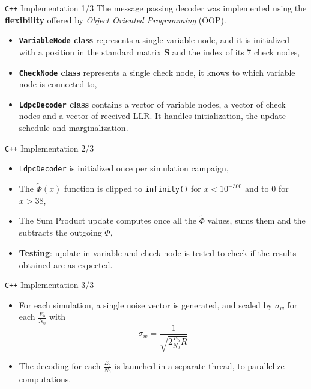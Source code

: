 \documentclass[pdf]
          {beamer}
\begin{document}
\begin{frame}{\texttt{C++} Implementation 1/3}
	The message passing decoder was implemented using the \textbf{flexibility} offered by \textit{Object Oriented Programming} (OOP). 
	\begin{itemize}
		\item \textbf{\texttt{VariableNode} class} represents a single variable node, and it is initialized with a position in the standard matrix $\mathbf{S}$ and the index of its 7 check nodes,
		\item \textbf{\texttt{CheckNode} class} represents a single check node, it knows to which variable node is connected to,
		\item \textbf{\texttt{LdpcDecoder} class} contains a vector of variable nodes, a vector of check nodes and a vector of received LLR. It handles initialization, the update schedule and marginalization.
	\end{itemize}
\end{frame}

\begin{frame}{\texttt{C++} Implementation 2/3} 
	\begin{itemize}
		\item \texttt{LdpcDecoder} is initialized once per simulation campaign,
		\item The $\tilde{\Phi}(x)$ function is clipped to \texttt{infinity()} for $x < 10^{-300}$ and to 0 for $x > 38$,
		\item The Sum Product update computes once all the $\tilde{\Phi}$ values, sums them and the subtracts the outgoing $\tilde{\Phi}$,
		\item \textbf{Testing}: update in variable and check node is tested to check if the results obtained are as expected.
	\end{itemize}
\end{frame}

\begin{frame}{\texttt{C++} Implementation 3/3} 
	\begin{itemize}
		\item For each simulation, a single noise vector is generated, and scaled by $\sigma_w$ for each $\frac{E_b}{N_0}$ with
		$$
			\sigma_w = \frac{1}{\sqrt{2 \frac{E_b}{N_0} R}}
		$$
		\item The decoding for each $\frac{E_b}{N_0}$ is launched in a separate thread, to parallelize computations.
	\end{itemize}
\end{frame}
\end{document}
